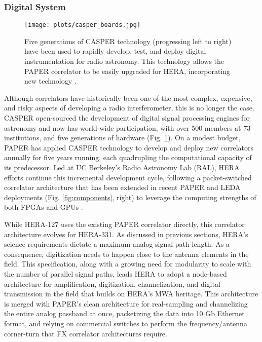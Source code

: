 \documentclass[preprint]{aastex}
\newcommand{\Mycitep}[1]{{\bf \citep{#1}}}
\newcommand{\compress}{\vspace{-0.25in}}
\newcommand{\Caption}[4]{\vspace{#1}\renewcommand{\baselinestretch}{#2}\caption{#4}\vspace{#3}}
\begin{document}
\compress
\subsubsection{Digital System}
\label{sec:digital}

\begin{figure}[t]\centering
\texttt{[image: plots/casper\_boards.jpg]}
\Caption{-0.3in}{0.99}{-0.15in}{\small
Five generations of CASPER technology (progressing left to right) have been used to rapidly
develop, test, and deploy digital instrumentation for radio astronomy.  This technology
allows the PAPER correlator to be 
easily upgraded for HERA, incorporating new technology
\Mycitep{parsons_et_al2006,parsons_et_al2008}.
}\label{fig:casper_boards}
\end{figure}

Although correlators have historically been one of the most complex,
expensive, and risky aspects of developing a radio interferometer, this is no longer the case.
CASPER \Mycitep{parsons_et_al2006}
open-sourced the development of digital signal processing engines for astronomy and
now has world-wide participation,
with over 500 members at 73 institutions, and 
five generations of hardware (Fig. \ref{fig:casper_boards}). 
On a modest budget, PAPER has applied CASPER technology to develop and deploy new correlators
annually for five years running, each quadrupling the computational capacity of its predecessor.
Led at UC Berkeley's Radio Astronomy Lab (RAL),
HERA efforts continue this incremental development cycle, following a packet-switched
correlator architecture \Mycitep{parsons_et_al2008} that has been
extended in recent PAPER and LEDA deployments (Fig. \ref{fig:components}, right)
to leverage the computing strengths of both FPGAs and GPUs \citep{clark_et_al2011}.

While HERA-127 uses the existing PAPER correlator directly, this correlator architecture evolves for
HERA-331.  As discussed in previous sections,
HERA's science requirements dictate a maximum analog signal path-length.  As a consequence,
digitization needs to happen close to the antenna
elements in the field.  This specification, along with a growing need for modularity to scale with the number of parallel signal paths,
leads HERA to adopt a node-based architecture for amplification, digitization, channelization, and digital
transmission in the field that builds on HERA's MWA heritage.  This architecture is merged with PAPER's clean 
architecture for real-sampling and channelizing the entire analog passband at once, packetizing the data into
10 Gb Ethernet format, and relying on commercial switches to perform the frequency/antenna corner-turn that
FX correlator architectures require. 
\end{document}
